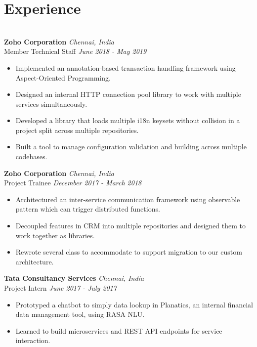 \documentclass{resume}
\begin{document}
\section*{Experience}
\titlerule
\noindent
\\
\textbf{Zoho Corporation} \hfill \textit{Chennai, India} \\
{\small Member Technical Staff} \hfill \textit{\small June 2018 - May 2019}
\begin{itemize}
  \item Implemented an annotation-based transaction handling framework using Aspect-Oriented Programming.
  \item Designed an internal HTTP connection pool library to work with multiple services simultaneously.
  \item Developed a library that loads multiple i18n keysets without collision in a project split across multiple repositories.
  \item Built a tool to manage configuration validation and building across multiple codebases.
\end{itemize}
\textbf{Zoho Corporation} \hfill \textit{Chennai, India} \\
{\small Project Trainee} \hfill \textit{\small December 2017 - March 2018}
\begin{itemize}
  \item Architectured an inter-service communication framework using observable pattern which can trigger distributed functions.
  \item Decoupled features in CRM into multiple repositories and designed them to work together as libraries.
  \item Rewrote several class to accommodate to support migration to our custom architecture.
\end{itemize}
\textbf{Tata Consultancy Services} \hfill \textit{Chennai, India} \\
{\small Project Intern} \hfill \textit{\small June 2017 - July 2017}
\begin{itemize}
  \item Prototyped a chatbot to simply data lookup in Planatics, an internal financial data management tool, using RASA NLU.
  \item Learned to build microservices and REST API endpoints for service interaction.
\end{itemize}
\end{document}
